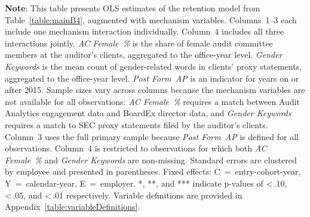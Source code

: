 \documentclass[11pt]{article}
\begin{document}
\clearpage
\begin{landscape}
\begin{table}[!htbp]
\begin{flushleft}
    \begin{threeparttable}[b]

        \captionsetup{labelfont=bf, singlelinecheck=off, justification=raggedright, labelsep=none}
        \caption{: Mechanisms}

        \footnotesize
        

        \begin{tablenotes}
            \footnotesize
            \item \textbf{Note}: This table presents OLS estimates of the retention model from Table~\ref{table:mainB4}, augmented with mechanism variables. Columns~1--3 each include one mechanism interaction individually. Column~4 includes all three interactions jointly. \textit{AC Female~\%} is the share of female audit committee members at the auditor's clients, aggregated to the office-year level. \textit{Gender Keywords} is the mean count of gender-related words in clients' proxy statements, aggregated to the office-year level. \textit{Post Form~AP} is an indicator for years on or after 2015. Sample sizes vary across columns because the mechanism variables are not available for all observations: \textit{AC Female~\%} requires a match between Audit Analytics engagement data and BoardEx director data, and \textit{Gender Keywords} requires a match to SEC proxy statements filed by the auditor's clients. Column~3 uses the full primary sample because \textit{Post Form~AP} is defined for all observations. Column~4 is restricted to observations for which both \textit{AC Female~\%} and \textit{Gender Keywords} are non-missing. Standard errors are clustered by employee and presented in parentheses. Fixed effects: C~=~entry-cohort-year, Y~=~calendar-year, E~=~employer. *, **, and *** indicate p-values of \textless\,.10, \textless\,.05, and \textless\,.01 respectively. Variable definitions are provided in Appendix~\ref{table:variableDefinitions}.
        \end{tablenotes}
        \label{table:mechanisms}
    \end{threeparttable}
\end{flushleft}
\end{table}
\end{landscape}
\end{document}
